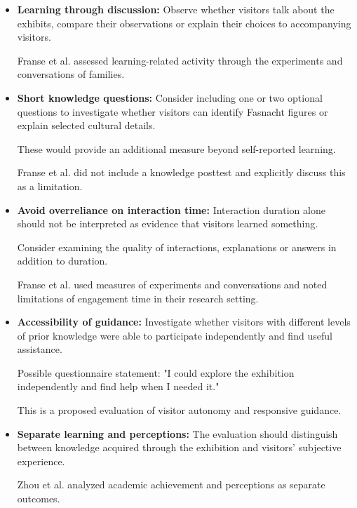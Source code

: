 \begin{itemize}
    \item \textbf{Learning through discussion:}
    Observe whether visitors talk about the exhibits,
    compare their observations or explain their
    choices to accompanying visitors.

    Franse et al. assessed learning-related activity
    through the experiments and conversations of families.
    \cite[pp.~709--710,~717--718]{franse_families_2021}

    \item \textbf{Short knowledge questions:}
    Consider including one or two optional questions
    to investigate whether visitors can identify
    Fasnacht figures or explain selected cultural details.

    These would provide an additional measure beyond
    self-reported learning.

    Franse et al. did not include a knowledge posttest
    and explicitly discuss this as a limitation.
    \cite[p.~732]{franse_families_2021}

    \item \textbf{Avoid overreliance on interaction time:}
    Interaction duration alone should not be interpreted
    as evidence that visitors learned something.

    Consider examining the quality of interactions,
    explanations or answers in addition to duration.

    Franse et al. used measures of experiments and
    conversations and noted limitations of engagement
    time in their research setting.
    \cite[pp.~709--710,~734]{franse_families_2021}

    \item \textbf{Accessibility of guidance:}
    Investigate whether visitors with different
    levels of prior knowledge were able to participate
    independently and find useful assistance.

    Possible questionnaire statement:
    "I could explore the exhibition independently
    and find help when I needed it."

    This is a proposed evaluation of visitor autonomy
    and responsive guidance.
    \cite[pp.~711,~733--734]{franse_families_2021}

    \item \textbf{Separate learning and perceptions:}
    The evaluation should distinguish between
    knowledge acquired through the exhibition
    and visitors' subjective experience.

    Zhou et al. analyzed academic achievement
    and perceptions as separate outcomes.
    \cite[pp.~5,~11--12]{zhou_meta-analytic_2022}


\end{itemize}
